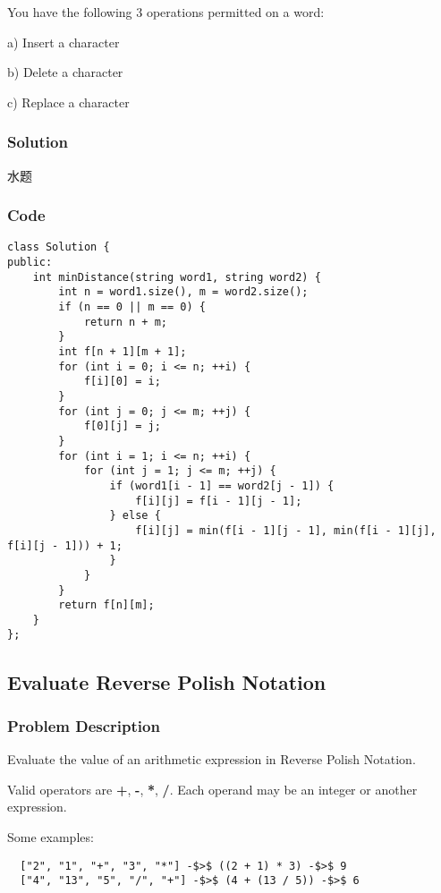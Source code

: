 \documentclass[courier]{article}
\begin{document}
\begin{CJK*}{UTF8}{gkai}
You have the following 3 operations permitted on a word:

a) Insert a character


b) Delete a character


c) Replace a character



\subsubsection*{Solution}
水题

\subsubsection*{Code}
\begin{lstlisting}
class Solution {
public:
    int minDistance(string word1, string word2) {
        int n = word1.size(), m = word2.size();
        if (n == 0 || m == 0) {
            return n + m;
        }
        int f[n + 1][m + 1];
        for (int i = 0; i <= n; ++i) {
            f[i][0] = i;
        }
        for (int j = 0; j <= m; ++j) {
            f[0][j] = j;
        }
        for (int i = 1; i <= n; ++i) {
            for (int j = 1; j <= m; ++j) {
                if (word1[i - 1] == word2[j - 1]) {
                    f[i][j] = f[i - 1][j - 1];
                } else {
                    f[i][j] = min(f[i - 1][j - 1], min(f[i - 1][j], f[i][j - 1])) + 1;
                }
            }
        }
        return f[n][m];
    }
}; 
\end{lstlisting}


\subsection{ Evaluate Reverse Polish Notation }

\subsubsection*{Problem Description}
Evaluate the value of an arithmetic expression in Reverse Polish Notation.

Valid operators are \textbf{+}, \textbf{-}, \textbf{*}, \textbf{/}. Each operand may be an integer or another expression.

Some examples:
\begin{verbatim}
  ["2", "1", "+", "3", "*"] -$>$ ((2 + 1) * 3) -$>$ 9
  ["4", "13", "5", "/", "+"] -$>$ (4 + (13 / 5)) -$>$ 6
\end{verbatim}




\end{CJK*}
\end{document}
